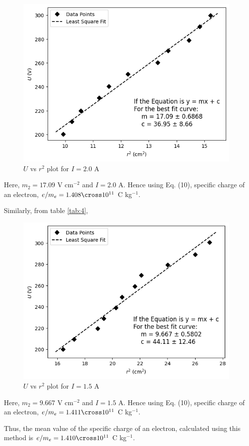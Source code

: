     \begin{figure}[H]
        \centering
        \includegraphics[height=0.7\columnwidth]{images/g3.png}
        \caption{$U$ vs $r^2$ plot for $I=2.0$ A}
        \label{graph:3}
    \end{figure}

    Here, $m_2=17.09$ V cm$^{-2}$ and $I=2.0$ A. Hence using Eq. (10), specific charge of an electron, $e/m_e=1.408\cross10^{11}$ C kg$^{-1}$.

    Similarly, from table \ref{tab:4}, 

    \begin{figure}[H]
        \centering
        \includegraphics[height=0.7\columnwidth]{images/g4.png}
        \caption{$U$ vs $r^2$ plot for $I=1.5$ A}
        \label{graph:4}
    \end{figure}

    Here, $m_2=9.667$ V cm$^{-2}$ and $I=1.5$ A. Hence using Eq. (10), specific charge of an electron, $e/m_e=1.411\cross10^{11}$ C kg$^{-1}$.

    Thus, the mean value of the specific charge of an electron, calculated using this method is $e/m_e=1.410\cross10^{11}$ C kg$^{-1}$.